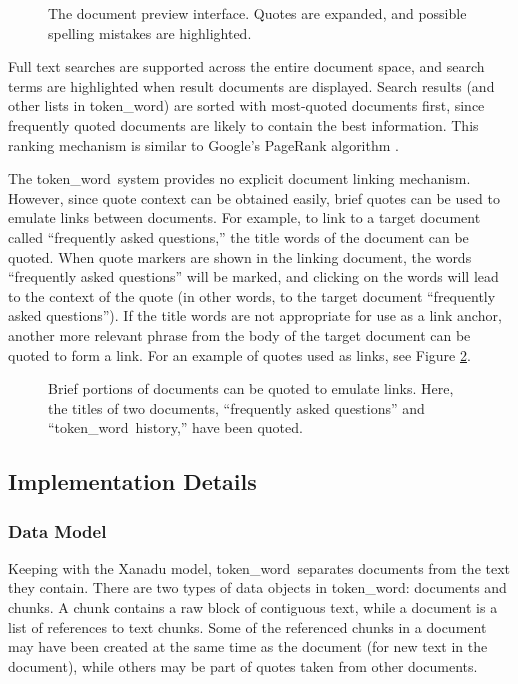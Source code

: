 \documentclass{acm_proc_article-sp}
\newcommand{\tokenWord}{token\_word}
\begin{document}
\begin{figure}[t]
\centering
{}
\caption{The document preview interface.  Quotes are expanded, and possible spelling mistakes are highlighted.}
\label{fig:docPreview}
\end{figure}

Full text searches are supported across the entire document space, and search terms are highlighted when result documents are displayed.
Search results (and other lists in \tokenWord) are sorted with most-quoted documents first, since frequently quoted documents are likely to contain the best information.
This ranking mechanism is similar to Google's PageRank algorithm \cite{Brin1998}. 

The \tokenWord \  system provides no explicit document linking mechanism.
However, since quote context can be obtained easily, brief quotes can be used to emulate links between documents.
For example, to link to a target document called ``frequently asked questions,'' the title words of the document can be quoted.
When quote markers are shown in the linking document, the words ``frequently asked questions'' will be marked, and clicking on the words will lead to the context of the quote (in other words, to the target document ``frequently asked questions'').
If the title words are not appropriate for use as a link anchor, another more relevant phrase from the body of the target document can be quoted to form a link.
For an example of quotes used as links, see Figure \ref{fig:quotesAsLinks}.

\begin{figure}[t]
\centering
{}
\caption{Brief portions of documents can be quoted to emulate links.  Here, the titles of two documents, ``frequently asked questions'' and ``\tokenWord \  history,'' have been quoted.}
\label{fig:quotesAsLinks}
\end{figure}

\subsection{Implementation Details}

\subsubsection{Data Model}
Keeping with the Xanadu model, \tokenWord \  separates documents from the text they contain.
There are two types of data objects in \tokenWord:  documents and chunks.
A chunk contains a raw block of contiguous text, while a document is a list of references to text chunks.
Some of the referenced chunks in a document may have been created at the same time as the document (for new text in the document), while others may be part of quotes taken from other documents.
\end{document}
